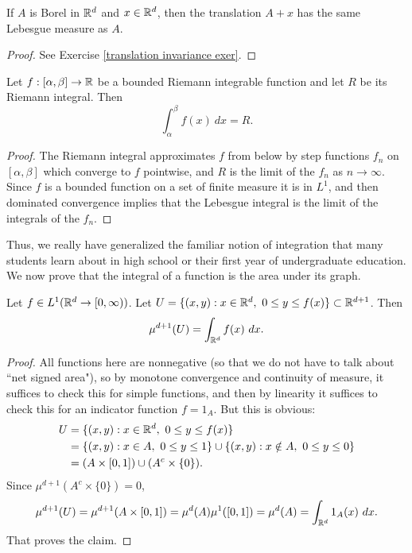 \begin{theorem}
\label{translation invariance in Rd}
If $A$ is Borel in $\mathbb{R}^d$ and $x \in \mathbb{R}^d$, then the translation $A + x$ has the same Lebesgue measure as $A$.
\end{theorem}
\begin{proof}
See Exercise \ref{translation invariance exer}.
\end{proof}

\begin{theorem}
Let $f: [\alpha, \beta] \to \mathbb{R}$ be a bounded Riemann integrable function and let $R$ be its Riemann integral. Then
$$\int_\alpha^\beta f(x)~dx = R.$$
\end{theorem}
\begin{proof}
The Riemann integral approximates $f$ from below by step functions $f_n$ on $[\alpha, \beta]$ which converge to $f$ pointwise, and $R$ is the limit of the $f_n$ as $n \to \infty$.
Since $f$ is a bounded function on a set of finite measure it is in $L^1$, and then dominated convergence implies that the Lebesgue integral is the limit of the integrals of the $f_n$.
\end{proof}

Thus, we really have generalized the familiar notion of integration that many students learn about in high school or their first year of undergraduate education.
We now prove that the integral of a function is the area under its graph.

\begin{theorem}
Let $f \in L^1(\mathbb{R}^d \to [0, \infty))$.
Let $U = \{(x, y): x \in \mathbb{R}^d, ~0 \leq y \leq f(x)\} \subset \mathbb{R}^{d+1}$.
Then
$$\mu^{d+1}(U) = \int_{\mathbb{R}^d} f(x)~dx.$$
\end{theorem}
\begin{proof}
All functions here are nonnegative (so that we do not have to talk about ``net signed area"), so by monotone convergence and continuity of measure, it suffices to check this for simple functions, and then by linearity it suffices to check this for an indicator function $f = 1_A$.
But this is obvious:
\begin{align*}U &= \{(x, y): x \in \mathbb{R}^d, ~0 \leq y \leq f(x)\} \\&= \{(x, y): x \in A, ~0 \leq y \leq 1\} \cup \{(x, y): x \notin A, ~0 \leq y \leq 0\} \\&= (A \times [0, 1]) \cup (A^c \times \{0\}).\end{align*}
Since $\mu^{d+1}(A^c \times \{0\}) = 0$,
$$\mu^{d+1}(U) = \mu^{d+1}(A \times [0, 1]) = \mu^d(A) \mu^1([0, 1]) = \mu^d(A) = \int_{\mathbb{R}^d} 1_A(x)~dx.$$
That proves the claim.
\end{proof}


